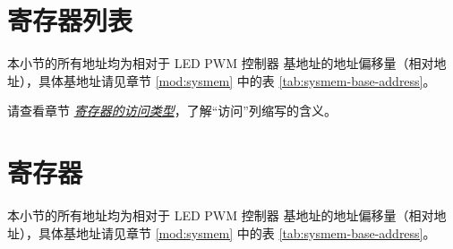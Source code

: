 \documentclass[main\_\_CN.tex]{subfiles}
\begin{document}



\clearpage
\hypertarget{ledpwm-reg-summ}{}
\section{寄存器列表}
\label{sec:ledpwm-reg-summ}


本小节的所有地址均为相对于 LED PWM 控制器 基地址的地址偏移量（相对地址），具体基地址请见章节 \ref{mod:sysmem} \textit{} 中的表 \ref{tab:sysmem-base-address}。

请查看章节 \hyperref[glossary-access-types]{\textit{寄存器的访问类型}}，了解“访问”列缩写的含义。






\clearpage
\section{寄存器}

本小节的所有地址均为相对于 LED PWM 控制器 基地址的地址偏移量（相对地址），具体基地址请见章节 \ref{mod:sysmem} \textit{} 中的表 \ref{tab:sysmem-base-address}。


\end{document}
